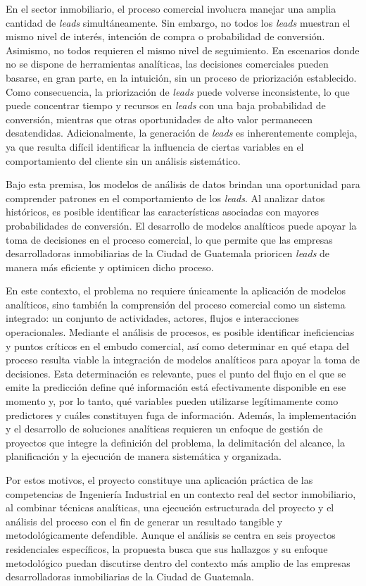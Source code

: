 En el sector inmobiliario, el proceso comercial involucra manejar una amplia cantidad de \textit{leads} simultáneamente. Sin embargo, no todos los \textit{leads} muestran el mismo nivel de interés, intención de compra o probabilidad de conversión. Asimismo, no todos requieren el mismo nivel de seguimiento. En escenarios donde no se dispone de herramientas analíticas, las decisiones comerciales pueden basarse, en gran parte, en la intuición, sin un proceso de priorización establecido. Como consecuencia, la priorización de \textit{leads} puede volverse inconsistente, lo que puede concentrar tiempo y recursos en \textit{leads} con una baja probabilidad de conversión, mientras que otras oportunidades de alto valor permanecen desatendidas. Adicionalmente, la generación de \textit{leads} es inherentemente compleja, ya que resulta difícil identificar la influencia de ciertas variables en el comportamiento del cliente sin un análisis sistemático.

Bajo esta premisa, los modelos de análisis de datos brindan una oportunidad para comprender patrones en el comportamiento de los \textit{leads}. Al analizar datos históricos, es posible identificar las características asociadas con mayores probabilidades de conversión. El desarrollo de modelos analíticos puede apoyar la toma de decisiones en el proceso comercial, lo que permite que las empresas desarrolladoras inmobiliarias de la Ciudad de Guatemala prioricen \textit{leads} de manera más eficiente y optimicen dicho proceso.

En este contexto, el problema no requiere únicamente la aplicación de modelos analíticos, sino también la comprensión del proceso comercial como un sistema integrado: un conjunto de actividades, actores, flujos e interacciones operacionales. Mediante el análisis de procesos, es posible identificar ineficiencias y puntos críticos en el embudo comercial, así como determinar en qué etapa del proceso resulta viable la integración de modelos analíticos para apoyar la toma de decisiones. Esta determinación es relevante, pues el punto del flujo en el que se emite la predicción define qué información está efectivamente disponible en ese momento y, por lo tanto, qué variables pueden utilizarse legítimamente como predictores y cuáles constituyen fuga de información. Además, la implementación y el desarrollo de soluciones analíticas requieren un enfoque de gestión de proyectos que integre la definición del problema, la delimitación del alcance, la planificación y la ejecución de manera sistemática y organizada.

Por estos motivos, el proyecto constituye una aplicación práctica de las competencias de Ingeniería Industrial en un contexto real del sector inmobiliario, al combinar técnicas analíticas, una ejecución estructurada del proyecto y el análisis del proceso con el fin de generar un resultado tangible y metodológicamente defendible. Aunque el análisis se centra en seis proyectos residenciales específicos, la propuesta busca que sus hallazgos y su enfoque metodológico puedan discutirse dentro del contexto más amplio de las empresas desarrolladoras inmobiliarias de la Ciudad de Guatemala.